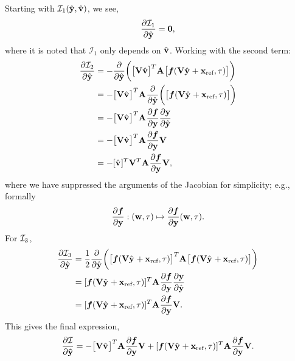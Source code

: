 \documentclass[3p,computermodern,10pt]{elsarticle}
\begin{document}
\begin{appendices}
Starting with $\mathcal{I}_1(\hat{\mathbf{y}},\hat{\mathbf{v}})$, we see,
$$\frac{\partial \mathcal{I}_1 }{\partial \hat{\mathbf{y}}} = \boldsymbol 0,$$
where it is noted that $\mathcal{I}_1$ only depends on $\hat{\mathbf{v}}$. Working with the second term:
\begin{align*}
\frac{\partial \mathcal{I}_2}{\partial \hat{\mathbf{y}}}  &= -\frac{\partial}{\partial \hat{\mathbf{y}}} \bigg( \big[ \mathbf {V} \hat{\mathbf{v}} \big]^T \mathbf{A}^{} \big[ \boldsymbol f(\mathbf {V} \hat{\mathbf{y}}^{} + \mathbf{x}_\text{ref},\tau) \big] \bigg) \\ 
&= - \big[ \mathbf {V} \hat{\mathbf{v}}^{} \big]^T \mathbf{A}^{} \frac{\partial}{\partial \hat{\mathbf{y}}^{}} \bigg( \big[ \boldsymbol f(\mathbf {V} \hat{\mathbf{y}}^{} + \mathbf{x}_\text{ref},\tau) \big]  \bigg)\\
 &= -\big[ \mathbf {V} \hat{\mathbf{v}}^{} \big]^T \mathbf{A}^{}   \frac{\partial \boldsymbol f}{\partial \mathbf{y}}\frac{\partial \mathbf{y}}{\partial \hat{\mathbf{y}}} \\
& = - \big[ \mathbf {V} \hat{\mathbf{v}}^{} \big]^T \mathbf{A}^{}  \frac{\partial \boldsymbol f}{\partial \mathbf{y}}\mathbf {V} \\
&= -[\hat{\mathbf{v}}^{}]^T \mathbf {V}^T \mathbf{A}^{} \frac{\partial \boldsymbol f}{\partial \mathbf{y}}  \mathbf {V},
\end{align*}
where we have suppressed the arguments of the Jacobian for simplicity; e.g., formally 
$$\frac{\partial \boldsymbol f}{\partial \mathbf{y}} : (\mathbf{w},\tau) \mapsto \frac{ \partial \boldsymbol f }{ \partial \mathbf{y}} (\mathbf{w}, \tau).$$ 
For $\mathcal{I}_3$,
\begin{align}\label{eq:i3sol}
\frac{\partial  \mathcal{I}_3}{\partial \hat{\mathbf{y}}}  &= \frac{1}{2} \frac{\partial }{\partial \hat{\mathbf{y}}} \bigg( \big[\boldsymbol f(\mathbf {V} \hat{\mathbf{y}}^{} + \mathbf{x}_\text{ref},\tau) \big]^T \mathbf{A}^{}\big[ \boldsymbol f(\mathbf {V} \hat{\mathbf{y}}^{} + \mathbf{x}_\text{ref},\tau) \big] \bigg) \\  
&=  [\boldsymbol f(\mathbf {V} \hat{\mathbf{y}}^{} + \mathbf{x}_\text{ref},\tau) ]^T \mathbf{A}^{} \frac{\partial \boldsymbol f}{\partial \mathbf{y}} \frac{\partial \mathbf{y}}{\partial \hat{\mathbf{y}}} \\
 &=   [\boldsymbol f(\mathbf {V} \hat{\mathbf{y}}^{} + \mathbf{x}_\text{ref},\tau) ]^T  \mathbf{A}^{} \frac{\partial \boldsymbol f}{\partial \mathbf{y}} \mathbf {V}.
\end{align}
This gives the final expression,
$$
 \frac{\partial \mathcal{I}}{\partial \boldsymbol {\hat{\mathbf{y}}}} = - \big[ \mathbf {V} \hat{\mathbf{v}}^{} \big]^T \mathbf{A}^{}  \frac{\partial \boldsymbol f}{\partial \mathbf{y}}\mathbf {V} +  [\boldsymbol f(\mathbf {V} \hat{\mathbf{y}}^{} + \mathbf{x}_\text{ref},\tau) ]^T \mathbf{A}^{} \frac{\partial \boldsymbol f}{\partial \mathbf{y}} \mathbf {V}.
$$
\end{appendices}
\end{document}
